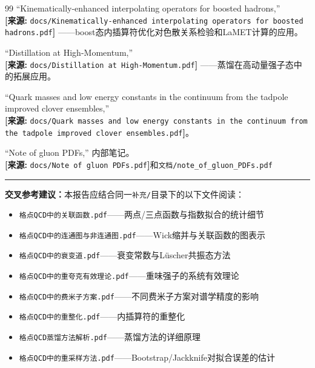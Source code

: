 \documentclass[12pt,a4paper]{ctexart}
\theoremstyle{definition}
\begin{document}
\begin{thebibliography}{99}
``Kinematically-enhanced interpolating operators for boosted hadrons,''
\\\textbf{[来源:} \texttt{docs/Kinematically-enhanced interpolating operators for boosted hadrons.pdf}\textbf{]}
——boost态内插算符优化对色散关系检验和LaMET计算的应用。

``Distillation at High-Momentum,''
\\\textbf{[来源:} \texttt{docs/Distillation at High-Momentum.pdf}\textbf{]}
——蒸馏在高动量强子态中的拓展应用。

``Quark masses and low energy constants in the continuum from the tadpole improved clover ensembles,''
\\\textbf{[来源:} \texttt{docs/Quark masses and low energy constants in the continuum from the tadpole improved clover ensembles.pdf}\textbf{]}。

``Note of gluon PDFs,'' 内部笔记。
\\\textbf{[来源:} \texttt{docs/Note of gluon PDFs.pdf}\textbf{]}和\texttt{文档/note\_of\_gluon\_PDFs.pdf}

\end{thebibliography}

\vspace{0.5cm}
\noindent\rule{\textwidth}{0.5pt}
\small
\textbf{交叉参考建议：}本报告应结合同一\texttt{补充/}目录下的以下文件阅读：
\begin{itemize}[nosep]
    \item \texttt{格点QCD中的关联函数.pdf}——两点/三点函数与指数拟合的统计细节
    \item \texttt{格点QCD中的连通图与非连通图.pdf}——Wick缩并与关联函数的图表示
    \item \texttt{格点QCD中的衰变道.pdf}——衰变常数与L\"uscher共振态方法
    \item \texttt{格点QCD中的重夸克有效理论.pdf}——重味强子的系统有效理论
    \item \texttt{格点QCD中的费米子方案.pdf}——不同费米子方案对谱学精度的影响
    \item \texttt{格点QCD中的重整化.pdf}——内插算符的重整化
    \item \texttt{格点QCD蒸馏方法解析.pdf}——蒸馏方法的详细原理
    \item \texttt{格点QCD中的重采样方法.pdf}——Bootstrap/Jackknife对拟合误差的估计
\end{itemize}
\end{document}
